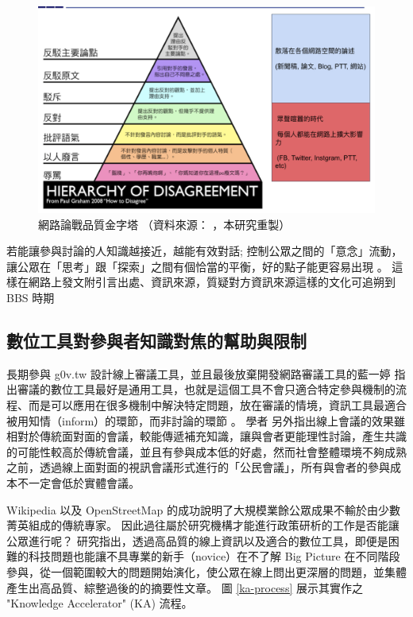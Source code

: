 \documentclass[12pt,a4paper]{article}
\begin{document}
\begin{figure}[htbp]
\centering
\includegraphics[width=.9\linewidth]{./images/how-to-disagree.png}
\caption{\label{fig:how-to-disagree}
網路論戰品質金字塔 （資料來源： \cite{zhu_2015} ，本研究重製）}
\end{figure}

若能讓參與討論的人知識越接近，越能有效對話; 控制公眾之間的「意念」流動，讓公眾在「思考」跟「探索」之間有個恰當的平衡，好的點子能更容易出現 \citep*{pentland14_shu}。 這樣在網路上發文附引言出處、資訊來源，質疑對方資訊來源這樣的文化可追朔到 BBS 時期 \citep*{malaita15}

\subsection{數位工具對參與者知識對焦的幫助與限制}
\label{sec:org4838b3b}
長期參與 g0v.tw 設計線上審議工具，並且最後放棄開發網路審議工具的藍一婷
指出審議的數位工具最好是通用工具，也就是這個工具不會只適合特定參與機制的流程、而是可以應用在很多機制中解決特定問題，放在審議的情境，資訊工具最適合被用知情（inform）的環節，而非討論的環節 \citep{etblue18,etblue2017}。 學者 \citep*{chen08} 另外指出線上會議的效果雖相對於傳統面對面的會議，較能傳遞補充知識，讓與會者更能理性討論，產生共識的可能性較高於傳統會議，並且有參與成本低的好處，然而社會整體環境不夠成熟之前，透過線上面對面的視訊會議形式進行的「公民會議」，所有與會者的參與成本不一定會低於實體會議。

Wikipedia 以及 OpenStreetMap 的成功說明了大規模業餘公眾成果不輸於由少數菁英組成的傳統專家。
因此過往屬於研究機構才能進行政策研析的工作是否能讓公眾進行呢？ \citep*{hahn16} 研究指出，透過高品質的線上資訊以及適合的數位工具，即便是困難的科技問題也能讓不具專業的新手（novice）在不了解 Big Picture 在不同階段參與，從一個範圍較大的問題開始演化，使公眾在線上問出更深層的問題，並集體產生出高品質、綜整過後的的摘要性文章。 圖 \ref{ka-process} 展示其實作之 "Knowledge Accelerator" (KA) 流程。
\end{document}
